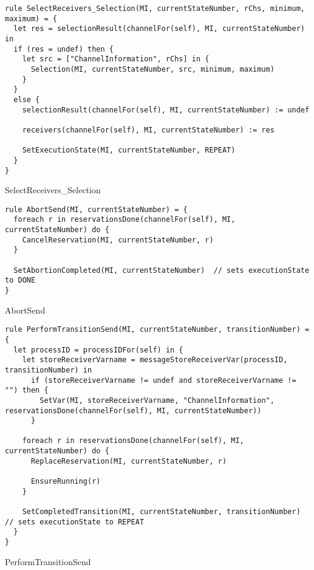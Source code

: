 \begin{listing}[H]
\begin{verbatim}
rule SelectReceivers_Selection(MI, currentStateNumber, rChs, minimum, maximum) = {
  let res = selectionResult(channelFor(self), MI, currentStateNumber) in
  if (res = undef) then {
    let src = ["ChannelInformation", rChs] in {
      Selection(MI, currentStateNumber, src, minimum, maximum)
    }
  }
  else {
    selectionResult(channelFor(self), MI, currentStateNumber) := undef

    receivers(channelFor(self), MI, currentStateNumber) := res

    SetExecutionState(MI, currentStateNumber, REPEAT)
  }
}
\end{verbatim}
\caption{SelectReceivers_Selection}
\label{lst:asm:SelectReceivers_Selection}
\end{listing}




\begin{listing}[H]
\begin{verbatim}
rule AbortSend(MI, currentStateNumber) = {
  foreach r in reservationsDone(channelFor(self), MI, currentStateNumber) do {
    CancelReservation(MI, currentStateNumber, r)
  }

  SetAbortionCompleted(MI, currentStateNumber)  // sets executionState to DONE
}
\end{verbatim}
\caption{AbortSend}
\label{lst:asm:AbortSend}
\end{listing}




\begin{listing}[H]
\begin{verbatim}
rule PerformTransitionSend(MI, currentStateNumber, transitionNumber) = {
  let processID = processIDFor(self) in {
    let storeReceiverVarname = messageStoreReceiverVar(processID, transitionNumber) in
      if (storeReceiverVarname != undef and storeReceiverVarname != "") then {
        SetVar(MI, storeReceiverVarname, "ChannelInformation", reservationsDone(channelFor(self), MI, currentStateNumber))
      }

    foreach r in reservationsDone(channelFor(self), MI, currentStateNumber) do {
      ReplaceReservation(MI, currentStateNumber, r)

      EnsureRunning(r)
    }

    SetCompletedTransition(MI, currentStateNumber, transitionNumber) // sets executionState to REPEAT
  }
}
\end{verbatim}
\caption{PerformTransitionSend}
\label{lst:asm:PerformTransitionSend}
\end{listing}





